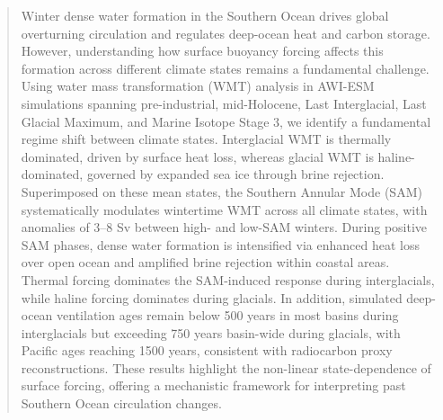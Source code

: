 \documentclass[draft]{agujournal2025}
\begin{document}
\begin{abstract}
Winter dense water formation in the Southern Ocean drives global overturning circulation and regulates deep-ocean heat and carbon storage. However, understanding how surface buoyancy forcing affects this formation across different climate states remains a fundamental challenge. Using water mass transformation (WMT) analysis in AWI-ESM simulations spanning pre-industrial, mid-Holocene, Last Interglacial, Last Glacial Maximum, and Marine Isotope Stage 3, we identify a fundamental regime shift between climate states.  Interglacial WMT is thermally dominated, driven by surface heat loss, whereas glacial WMT is haline-dominated, governed by expanded sea ice through brine rejection. Superimposed on these mean states, the Southern Annular Mode (SAM) systematically modulates wintertime WMT across all  climate states, with anomalies of 3–8 Sv between high- and low-SAM winters. During positive SAM phases, dense water formation is intensified via enhanced heat loss over open ocean and amplified brine rejection within coastal areas. Thermal forcing dominates the SAM-induced response during interglacials, while haline forcing dominates during glacials.  In addition, simulated deep-ocean ventilation ages remain below 500 years in most basins during interglacials but exceeding 750 years basin-wide during glacials, with Pacific ages reaching 1500 years, consistent with radiocarbon proxy reconstructions. These results highlight the non-linear state-dependence of surface forcing, offering a mechanistic framework for interpreting past Southern Ocean circulation changes.




\end{abstract}
\end{document}
